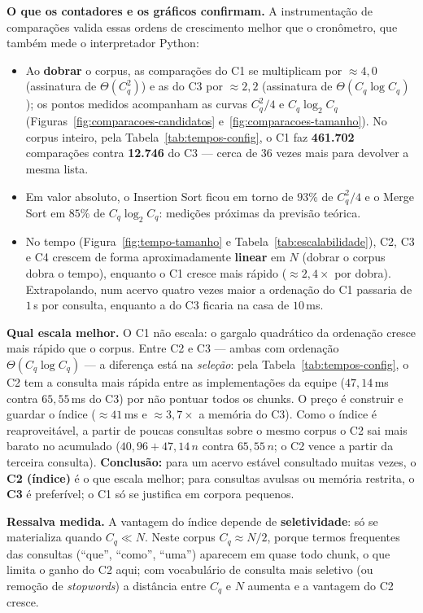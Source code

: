 \documentclass[11pt,a4paper]{article}
\begin{document}
\textbf{O que os contadores e os gráficos confirmam.} A instrumentação de comparações valida essas
ordens de crescimento melhor que o cronômetro, que também mede o interpretador Python:
\begin{itemize}[leftmargin=1.4em,itemsep=2pt]
\item Ao \textbf{dobrar} o corpus, as comparações do C1 se multiplicam por $\approx 4{,}0$ (assinatura de
$\Theta(C_q^2)$) e as do C3 por $\approx 2{,}2$ (assinatura de $\Theta(C_q\log C_q)$); os pontos medidos
acompanham as curvas $C_q^2/4$ e $C_q\log_2 C_q$ (Figuras~\ref{fig:comparacoes-candidatos}
e~\ref{fig:comparacoes-tamanho}). No corpus inteiro, pela Tabela~\ref{tab:tempos-config}, o C1 faz
\textbf{461.702} comparações contra \textbf{12.746} do C3 --- cerca de 36 vezes mais para devolver a
mesma lista.
\item Em valor absoluto, o Insertion Sort ficou em torno de $93\%$ de $C_q^2/4$ e o Merge Sort em $85\%$
de $C_q\log_2 C_q$: medições próximas da previsão teórica.
\item No tempo (Figura~\ref{fig:tempo-tamanho} e Tabela~\ref{tab:escalabilidade}), C2, C3 e C4 crescem de
forma aproximadamente \textbf{linear} em $N$ (dobrar o corpus dobra o tempo), enquanto o C1 cresce mais
rápido ($\approx 2{,}4\times$ por dobra). Extrapolando, num acervo quatro vezes maior a ordenação do C1
passaria de $1$\,s por consulta, enquanto a do C3 ficaria na casa de $10$\,ms.
\end{itemize}

\textbf{Qual escala melhor.} O C1 não escala: o gargalo quadrático da ordenação cresce mais rápido que o
corpus. Entre C2 e C3 --- ambas com ordenação $\Theta(C_q\log C_q)$ --- a diferença está na
\emph{seleção}: pela Tabela~\ref{tab:tempos-config}, o C2 tem a consulta mais rápida entre as
implementações da equipe ($47{,}14$\,ms contra $65{,}55$\,ms do C3) por não pontuar todos os chunks. O
preço é construir e guardar o índice ($\approx 41$\,ms e $\approx 3{,}7\times$ a memória do C3). Como o
índice é reaproveitável, a partir de poucas consultas sobre o mesmo corpus o C2 sai mais barato no
acumulado ($40{,}96 + 47{,}14\,n$ contra $65{,}55\,n$; o C2 vence a partir da terceira consulta).
\textbf{Conclusão:} para um acervo estável consultado muitas vezes, o \textbf{C2 (índice)} é o que escala
melhor; para consultas avulsas ou memória restrita, o \textbf{C3} é preferível; o C1 só se justifica em
corpora pequenos.

\textbf{Ressalva medida.} A vantagem do índice depende de \textbf{seletividade}: só se materializa quando
$C_q\ll N$. Neste corpus $C_q\approx N/2$, porque termos frequentes das consultas (``que'', ``como'',
``uma'') aparecem em quase todo chunk, o que limita o ganho do C2 aqui; com vocabulário de consulta mais
seletivo (ou remoção de \emph{stopwords}) a distância entre $C_q$ e $N$ aumenta e a vantagem do C2 cresce.
\end{document}
